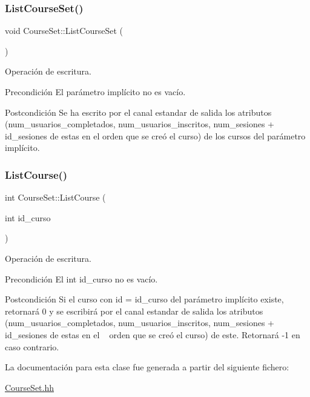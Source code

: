\subsubsection{\texorpdfstring{List\+Course\+Set()}{ListCourseSet()}}
{\footnotesize\ttfamily void Course\+Set\+::\+List\+Course\+Set (\begin{DoxyParamCaption}{ }\end{DoxyParamCaption})}



Operación de escritura. 

\begin{DoxyPrecond}{Precondición}
El parámetro implícito no es vacío. 
\end{DoxyPrecond}
\begin{DoxyPostcond}{Postcondición}
Se ha escrito por el canal estandar de salida los atributos (num\+\_\+usuarios\+\_\+completados, num\+\_\+usuarios\+\_\+inscritos, num\+\_\+sesiones + id\+\_\+sesiones de estas en el orden que se creó el curso) de los cursos del parámetro implícito. 
\end{DoxyPostcond}
\mbox{\label{class_course_set_aee3609cbaa62ae2be155754613d484e3}} 
\subsubsection{\texorpdfstring{List\+Course()}{ListCourse()}}
{\footnotesize\ttfamily int Course\+Set\+::\+List\+Course (\begin{DoxyParamCaption}\item[{int}]{id\+\_\+curso }\end{DoxyParamCaption})}



Operación de escritura. 

\begin{DoxyPrecond}{Precondición}
El int id\+\_\+curso no es vacío. 
\end{DoxyPrecond}
\begin{DoxyPostcond}{Postcondición}
Si el curso con id = id\+\_\+curso del parámetro implícito existe, retornará 0 y se escribirá por el canal estandar de salida los atributos (num\+\_\+usuarios\+\_\+completados, num\+\_\+usuarios\+\_\+inscritos, num\+\_\+sesiones + id\+\_\+sesiones de estas en el ~\newline
 orden que se creó el curso) de este. Retornará -\/1 en caso contrario. 
\end{DoxyPostcond}


La documentación para esta clase fue generada a partir del siguiente fichero\+:\begin{DoxyCompactItemize}
\item 
\mbox{\hyperlink{_course_set_8hh}{Course\+Set.\+hh}}\end{DoxyCompactItemize}

